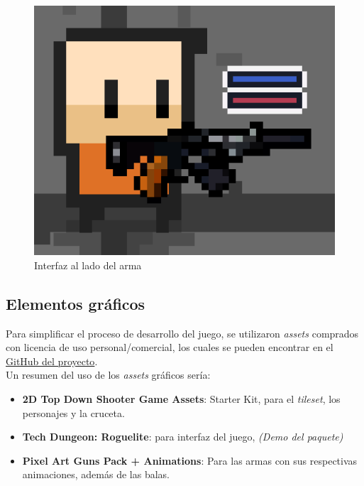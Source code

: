\documentclass[11pt]{article}
\begin{document}
        \begin{figure}[H]
            \centering
            \includegraphics[scale = 0.5]{Images/UI descartada.png}
            \caption{Interfaz al lado del arma}
            \label{fig:UI descartada}
        \end{figure}
        
    \subsection{Elementos gráficos}
        
        Para simplificar el proceso de desarrollo del juego, se utilizaron \textit{assets} comprados con licencia de uso personal/comercial, los cuales se pueden encontrar en el \href{https://github.com/JesusJMUJI/TopDownShooterGame}{GitHub del proyecto}.\\
        
        Un resumen del uso de los \textit{assets} gráficos sería:
        \begin{itemize}
            \item \textbf{2D Top Down Shooter Game Assets}: Starter Kit, para el \textit{tileset}, los personajes y la cruceta.
            \item \textbf{Tech Dungeon: Roguelite}: para interfaz del juego, \textit{(Demo del paquete)}
            \item \textbf{Pixel Art Guns Pack + Animations}: Para las armas con sus respectivas animaciones, además de las balas.
        \end{itemize}
        
\end{document}
